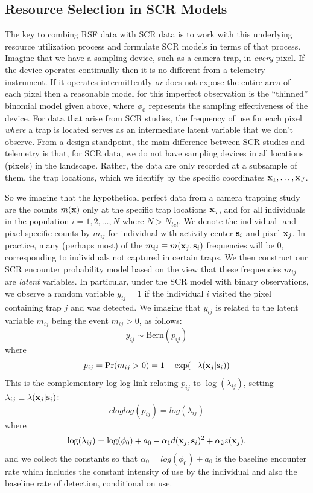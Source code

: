 \documentclass[12pt]{article}
\begin{document}
\subsection{Resource Selection in SCR Models}

The key to combing RSF data with SCR data is to work with this
underlying resource utilization process and formulate SCR models in
terms of that process.  Imagine that we have a sampling device, such
as a camera trap, in {\it every} pixel. If the device operates
continually then it is no different from a telemetry instrument.  If
it operates intermittently {\it or} does not expose the entire area of
each pixel then a reasonable model for this imperfect observation is
the ``thinned'' binomial model given above, where $\phi_{0}$
represents the sampling effectiveness of the device.  For data that
arise from SCR studies, the frequency of use for each pixel {\it where}
  a trap is located serves as an intermediate latent variable that we
don't observe. From a design standpoint, the main difference between
SCR studies and telemetry is that, for SCR data, we do not have
sampling devices in all locations (pixels) in the landscape. Rather,
the data are only recorded at a subsample of them, the trap locations,
which we identify by the specific coordinates ${\bf x}_{1},\ldots,{\bf
  x}_{J}$.

So we imagine
that the hypothetical perfect data from a camera trapping study are
the counts $m({\bf x})$ only at the specific trap locations
${\bf x}_{j}$, and for all individuals in the population
$i=1,2,\ldots,N$ 
where $N> N_{tel}$. We denote the individual- and
pixel-specific counts by $m_{ij}$ for individual with activity center
${\bf s}_{i}$ and pixel ${\bf x}_{j}$.
 In practice, many (perhaps most)
of the $m_{ij} \equiv m({\bf x}_{j},{\bf s}_{i})$ frequencies will be 0,
corresponding to individuals not captured in certain traps.
We then construct our SCR encounter
probability model based on the
view that these frequencies $m_{ij}$ are {\it latent} variables. In particular,
under the SCR model with binary observations,
 we observe a random variable
$y_{ij} = 1$  if the individual $i$ visited the pixel
containing trap $j$ and was detected.
We imagine that $y_{ij}$ is related to the latent variable $m_{ij}$ being the
event $m_{ij}>0$, as follows:
\[
 y_{ij} \sim \mbox{Bern}(p_{ij})
\]
where
\[
 p_{ij} = \Pr(m_{ij}>0) =  1-\exp(- \lambda({\bf x}_{j}|{\bf s}_{i}))
\]
This is the complementary log-log link relating
$p_{ij}$ to $\log(\lambda_{ij})$, setting
$\lambda_{ij} \equiv \lambda({\bf x}_{j}|{\bf s}_{i})$:
\[
 cloglog(p_{ij}) = log(\lambda_{ij})
\]
where
\[
 \log(\lambda_{ij} ) = \log(\phi_{0}) + a_{0} -\alpha_{1} d({\bf
   x}_{j},{\bf s}_{i})^{2} +  \alpha_{2} z({\bf x}_{j}).
\]
and we collect the constants so that $\alpha_{0} = log(\phi_{0}) +
a_{0}$ is the
 baseline encounter rate which includes
the constant intensity of use by the individual and also the baseline
rate of detection, conditional on use.
\end{document}
